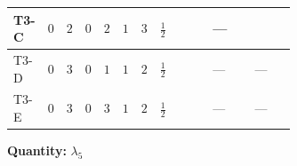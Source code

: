 \documentclass[8pt]{article}
\begin{document}
\begin{landscape}
\begin{longtable}{@{}llcccccc >{\raggedright\arraybackslash}p{0.21\linewidth} >{\raggedright\arraybackslash}p{0.21\linewidth} >{\raggedright\arraybackslash}p{0.21\linewidth}@{}}
\midrule
T3-C & $0$ & $2$ & $0$ & $2$ & $1$ & $3$ & $\frac{1}{2}$ & \scriptsize\adjustbox{max width=\linewidth}{$\begin{gathered} +4 {\lambda_{HS_2}^{(1)}} {\lambda_5}\end{gathered}$} & --- & \scriptsize\adjustbox{max width=\linewidth}{$\begin{gathered} -9 {g_2}^2 {\lambda_5}\end{gathered}$} \\
\midrule
T3-D & $0$ & $3$ & $0$ & $1$ & $1$ & $2$ & $\frac{1}{2}$ & \scriptsize\adjustbox{max width=\linewidth}{$\begin{gathered} +4 {\lambda_{HS_2}^{(1)}} {\lambda_5}\end{gathered}$} & --- & --- \\
\midrule
T3-E & $0$ & $3$ & $0$ & $3$ & $1$ & $2$ & $\frac{1}{2}$ & \scriptsize\adjustbox{max width=\linewidth}{$\begin{gathered} +4 {\lambda_{HS_2}^{(1)}} {\lambda_5}\end{gathered}$} & --- & --- \\
\midrule
\bottomrule
\end{longtable}
\clearpage
\noindent\textbf{Quantity: }$\lambda_5$\par\smallskip

\end{landscape}
\end{document}
